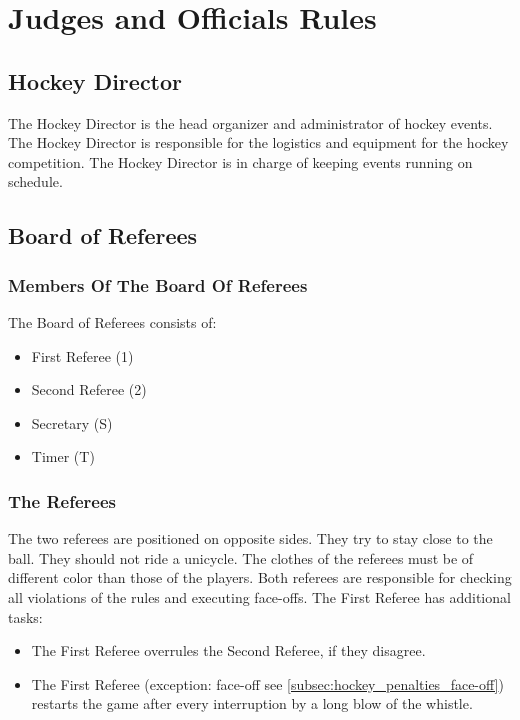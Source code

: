 \chapter{Judges and Officials Rules}

\section{Hockey Director}

The Hockey Director is the head organizer and administrator of hockey events.
The Hockey Director is responsible for the logistics and equipment for the hockey competition.
The Hockey Director is in charge of keeping events running on schedule.

\section{Board of Referees}

\subsection{Members Of The Board Of Referees}
\begin{figure}
\centering

\end{figure}

The Board of Referees consists of:
\begin{itemize}
\item First Referee (1)
\item Second Referee (2)
\item Secretary (S)
\item Timer (T)
\end{itemize}

\subsection{The Referees}
The two referees are positioned on opposite sides.
They try to stay close to the ball.
They should not ride a unicycle.
The clothes of the referees must be of different color than those of the players.
Both referees are responsible for checking all violations of the rules and executing face-offs.
The First Referee has additional tasks:
\begin{itemize}
\item The First Referee overrules the Second Referee, if they disagree.
\item The First Referee (exception: face-off see \ref{subsec:hockey_penalties_face-off}) restarts the game after every interruption by a long blow of the whistle.
\end{itemize}

